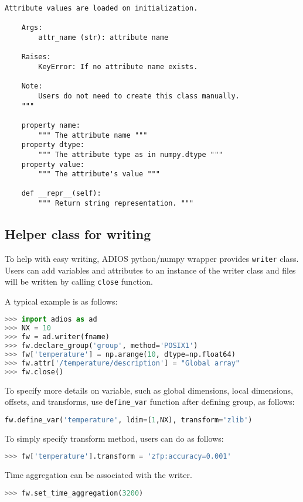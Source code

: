 \begin{lstlisting}[language=cython,caption={Read functions},label={},]
    Attribute values are loaded on initialization.

    Args:
        attr_name (str): attribute name

    Raises:
        KeyError: If no attribute name exists.

    Note:
        Users do not need to create this class manually.        
    """

    property name:
        """ The attribute name """
    property dtype:
        """ The attribute type as in numpy.dtype """
    property value:
        """ The attribute's value """

    def __repr__(self):
        """ Return string representation. """
\end{lstlisting}

\subsection{Helper class for writing}
To help with easy writing, ADIOS python/numpy wrapper provides \verb+writer+ class. Users can add variables and attributes to an instance of the writer class and files will be written by calling \verb+close+ function.

A typical example is as follows:
\begin{lstlisting}[language=Python,caption={An example of the use of the writer class},label={},]
>>> import adios as ad
>>> NX = 10
>>> fw = ad.writer(fname)
>>> fw.declare_group('group', method='POSIX1')
>>> fw['temperature'] = np.arange(10, dtype=np.float64)
>>> fw.attr['/temperature/description'] = "Global array"
>>> fw.close()
\end{lstlisting}

To specify more details on variable, such as global dimensions, local dimensions, offsets, and transforms, use \verb+define_var+ function after defining group, as follows:
\begin{lstlisting}[language=Python,caption={An example of define var function},label={},]
fw.define_var('temperature', ldim=(1,NX), transform='zlib')
\end{lstlisting}

To simply specify transform method, users can do as follows:
\begin{lstlisting}[language=Python,caption={An example of using transform method},label={},]
>>> fw['temperature'].transform = 'zfp:accuracy=0.001'
\end{lstlisting}

Time aggregation can be associated with the writer.
\begin{lstlisting}[language=Python,caption={An example of time aggregation method},label={},]
>>> fw.set_time_aggregation(3200)
\end{lstlisting}

